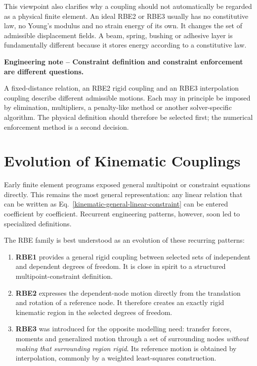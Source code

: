 This viewpoint also clarifies why a coupling should not automatically be regarded
as a physical finite element. An ideal RBE2 or RBE3 usually has no constitutive
law, no Young's modulus and no strain energy of its own. It changes the set of
admissible displacement fields. A beam, spring, bushing or adhesive layer is
fundamentally different because it stores energy according to a constitutive law.

\begin{bbox}
\textbf{Engineering note -- Constraint definition and constraint enforcement are different questions.}

A fixed-distance relation, an RBE2 rigid coupling and an RBE3 interpolation
coupling describe different admissible motions. Each may in principle be imposed
by elimination, multipliers, a penalty-like method or another solver-specific
algorithm. The physical definition should therefore be selected first; the
numerical enforcement method is a second decision.
\end{bbox}

\section{Evolution of Kinematic Couplings}

Early finite element programs exposed general multipoint or constraint equations
directly. This remains the most general representation: any linear relation that
can be written as Eq.~\eqref{kinematic-general-linear-constraint} can be entered
coefficient by coefficient. Recurrent engineering patterns, however, soon led to
specialized definitions.

The RBE family is best understood as an evolution of these recurring patterns:

\begin{enumerate}
    \item \textbf{RBE1} provides a general rigid coupling between selected sets
          of independent and dependent degrees of freedom. It is close in spirit
          to a structured multipoint-constraint definition.
    \item \textbf{RBE2} expresses the dependent-node motion directly from the
          translation and rotation of a reference node. It therefore creates an
          exactly rigid kinematic region in the selected degrees of freedom.
    \item \textbf{RBE3} was introduced for the opposite modelling need: transfer
          forces, moments and generalized motion through a set of surrounding
          nodes \textit{without making that surrounding region rigid}. Its
          reference motion is obtained by interpolation, commonly by a weighted
          least-squares construction.
\end{enumerate}

